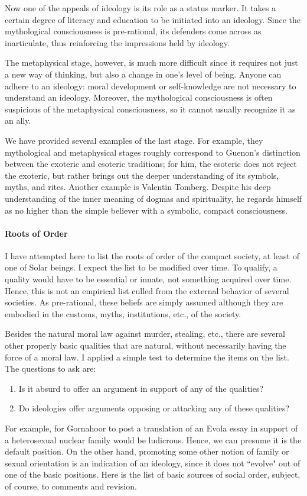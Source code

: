 Now one of the appeals of ideology is its role as a status marker. It takes a certain degree of literacy and education to be initiated into an ideology. Since the mythological consciousness is pre-rational, its defenders come across as inarticulate, thus reinforcing the impressions held by ideology.

The metaphysical stage, however, is much more difficult since it requires not just a new way of thinking, but also a change in one's level of being. Anyone can adhere to an ideology: moral development or self-knowledge are not necessary to understand an ideology. Moreover, the mythological consciousness is often suspicious of the metaphysical consciousness, so it cannot usually recognize it as an ally.

We have provided several examples of the last stage. For example, they mythological and metaphysical stages roughly correspond to Guenon's distinction between the exoteric and esoteric traditions; for him, the esoteric does not reject the exoteric, but rather brings out the deeper understanding of its symbols, myths, and rites. Another example is Valentin Tomberg. Despite his deep understanding of the inner meaning of dogmas and spirituality, he regards himself as no higher than the simple believer with a symbolic, compact consciousness.

\paragraph{Roots of Order}
I have attempted here to list the roots of order of the compact society, at least of one of Solar beings. I expect the list to be modified over time. To qualify, a quality would have to be essential or innate, not something acquired over time. Hence, this is not an empirical list culled from the external behavior of several societies. As pre-rational, these beliefs are simply assumed although they are embodied in the customs, myths, institutions, etc., of the society.

Besides the natural moral law against murder, stealing, etc., there are several other properly basic qualities that are natural, without necessarily having the force of a moral law. I applied a simple test to determine the items on the list. The questions to ask are:

\begin{enumerate}
\item Is it absurd to offer an argument in support of any of the qualities? 
\item Do ideologies offer arguments opposing or attacking any of these qualities? 
\end{enumerate}
For example, for Gornahoor to post a translation of an Evola essay in support of a heterosexual nuclear family would be ludicrous. Hence, we can presume it is the default position. On the other hand, promoting some other notion of family or sexual orientation is an indication of an ideology, since it does not ``evolve" out of one of the basic positions. Here is the list of basic sources of social order, subject, of course, to comments and revision.

